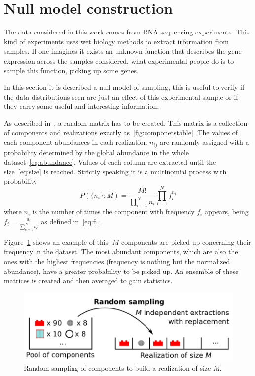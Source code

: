\section{Null model construction}\label{sec:nullmodel}
The data considered in this work comes from RNA-sequencing experiments. This kind of experiments uses wet biology methods to extract information from samples. If one imagines it exists an unknown function that describes the gene expression across the samples considered, what experimental people do is to sample this function, picking up some genes.

In this section it is described a null model of sampling, this is useful to verify if the data distributions seen are just an effect of this experimental sample or if they carry some useful and interesting information.

As described in~\cite{Mazzolini2018}, a random matrix has to be created. This matrix is a collection of components and realizations exactly as~\ref{fig:componetstable}. The values of each component abundances in each realization $n_{i j}$ are randomly assigned with a probability determined by 
the global abundance in the whole dataset~\ref{eq:abundance}. Values of each column are extracted until the size~\ref{eq:size} is 
reached. Strictly speaking it is a multinomial process with probability
\begin{equation}
P\left( \{ n_i\} ;M\right) =\frac{M!}{\prod_{i=1}^{N} n_i}\prod_{i=1}^N f_i^{n_i}
\end{equation}
where $n_i$ is the number of times the component with frequency $f_i$ appears, being $f_i=\frac{a_i}{\sum_{c=1}^{N}a_{c}}$ as defined in~\ref{eq:fi}.

Figure~\ref{fig:structure/randomsampling} shows an example of this, $M$ components are picked up concerning their frequency in the dataset. The most abundant components, which are also the ones with the highest frequencies (frequency is nothing but the normalized abundance), have a greater probability to be picked up. An ensemble of these matrices is created and then averaged to gain statistics.
\begin{figure}[htb!]
    \centering
    \includegraphics[width=0.8\linewidth]{pictures/structure/randomsampling.png}
    \caption{Random sampling of components to build a realization of size $M$.}
    \label{fig:structure/randomsampling}
\end{figure}

